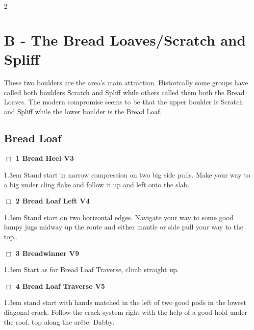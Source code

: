 	\begin{multicols}{2}
\section{B - The Bread Loaves/Scratch and Spliff}\label{sa:The Bread Loaves}
These two boulders are the area's main attraction. Historically some groups have called both boulders Scratch and Spliff while others called them both the Bread Loaves. The modern compromise seems to be that the upper boulder is Scratch and Spliff while the lower boulder is the Bread Loaf.\\
\needspace{10em}
\subsection*{Bread Loaf}\label{bf:Bread Loaf}
\needspace{2em}
\label{rt:Bread Heel}
\colorbox{green!20}{
\parbox{0.95\linewidth}{
\hspace{-1ex}\textbf{$\Box$
1 Bread Heel V3  
}}}
\begin{adjustwidth}{1.3em}{}			
Stand start in narrow compression on two big side pulls. Make your way to a big under cling flake and follow it up and left onto the slab.
\end{adjustwidth}
\needspace{2em}
\label{rt:Bread Loaf Left}
\colorbox{RoyalBlue!20}{
\parbox{0.95\linewidth}{
\hspace{-1ex}\textbf{$\Box$
2 Bread Loaf Left V4  
}}}
\begin{adjustwidth}{1.3em}{}			
Stand start on two horizontal edges. Navigate your way to some good lumpy jugs midway up the route and either mantle or side pull your way to the top..
\end{adjustwidth}
\needspace{2em}
\label{rt:Breadwinner}
\colorbox{Goldenrod!20}{
\parbox{0.95\linewidth}{
\hspace{-1ex}\textbf{$\Box$
3 Breadwinner V9  
}}}
\begin{adjustwidth}{1.3em}{}			
Start as for Bread Loaf Traverse, climb straight up.
\end{adjustwidth}
\needspace{2em}
\label{rt:Bread Loaf Traverse}
\colorbox{RoyalBlue!20}{
\parbox{0.95\linewidth}{
\hspace{-1ex}\textbf{$\Box$
4 Bread Loaf Traverse V5  
}}}
\begin{adjustwidth}{1.3em}{}			
stand start with hands matched in the left of two good pods in the lowest diagonal crack. Follow the crack system right with the help of a good hold under the roof. top along the arête. Dabby.

\end{adjustwidth}
\end{multicols}
